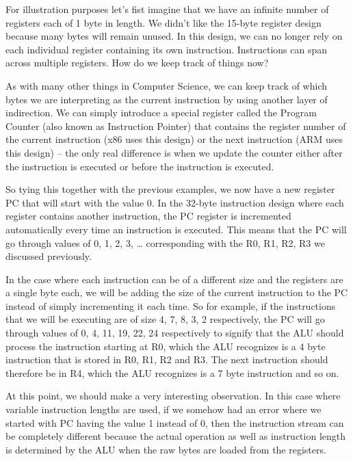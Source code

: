 For illustration purposes let’s fist imagine that we have an infinite number of registers each of 1 byte in length. We didn’t like the 15-byte register design because many bytes will remain unused. In this design, we can no longer rely on each individual register containing its own instruction. Instructions can span across multiple registers. How do we keep track of things now?

As with many other things in Computer Science, we can keep track of which bytes we are interpreting as the current instruction by using another layer of indirection. We can simply introduce a special register called the Program Counter (also known as Instruction Pointer) that contains the register number of the current instruction (x86 uses this design) or the next instruction (ARM uses this design) -- the only real difference is when we update the counter either after the instruction is executed or before the instruction is executed. 

So tying this together with the previous examples, we now have a new register PC that will start with the value 0. In the 32-byte instruction design where each register contains another instruction, the PC register is incremented automatically every time an instruction is executed. This means that the PC will go through values of 0, 1, 2, 3, … corresponding with the R0, R1, R2, R3 we discussed previously.

In the case where each instruction can be of a different size and the registers are a single byte each, we will be adding the size of the current instruction to the PC instead of simply incrementing it each time. So for example, if the instructions that we will be executing are of size 4, 7, 8, 3, 2 respectively, the PC will go through values of 0, 4, 11, 19, 22, 24 respectively to signify that the ALU should process the instruction starting at R0, which the ALU recognizes is a 4 byte instruction that is stored in R0, R1, R2 and R3. The next instruction should therefore be in R4, which the ALU recognizes is a 7 byte instruction and so on.

At this point, we should make a very interesting observation. In this case where variable instruction lengths are used, if we somehow had an error where we started with PC having the value 1 instead of 0, then the instruction stream can be completely different because the actual operation as well as instruction length is determined by the ALU when the raw bytes are loaded from the registers. 

